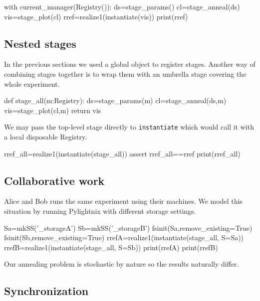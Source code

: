 \begin{pythontexcode}
with current_manager(Registry()):
  ds=stage_params()
  cl=stage_anneal(ds)
  vis=stage_plot(cl)
  rref=realize1(instantiate(vis))
  print(rref)
\end{pythontexcode}

\mystdout

\subsection{Nested stages}

In the previous sections we used a global
 object to register stages. Another way
of combining stages together is to wrap them with an umbrella stage covering the
whole experiment.

\begin{pythontexcode}
def stage_all(m:Registry):
  ds=stage_params(m)
  cl=stage_anneal(ds,m)
  vis=stage_plot(cl,m)
  return vis
\end{pythontexcode}

We may pass the top-level stage directly to \texttt{instantiate}
which would call it with a local disposable Registry.

\begin{pythontexcode}
rref_all=realize1(instantiate(stage_all))
assert rref_all==rref
print(rref_all)
\end{pythontexcode}

\mystdout


\subsection{Collaborative work}

Alice and Bob runs the same experiment using their machines. We model
this situation by running Pylightnix with different storage settings.

\begin{pythontexcode}
Sa=mkSS('_storageA')
Sb=mkSS('_storageB')
fsinit(Sa,remove_existing=True)
fsinit(Sb,remove_existing=True)
rrefA=realize1(instantiate(stage_all, S=Sa))
rrefB=realize1(instantiate(stage_all, S=Sb))
print(rrefA)
print(rrefB)
\end{pythontexcode}

Our annealing problem is stochastic by nature so the results naturally differ.

\subsection{Synchronization}

